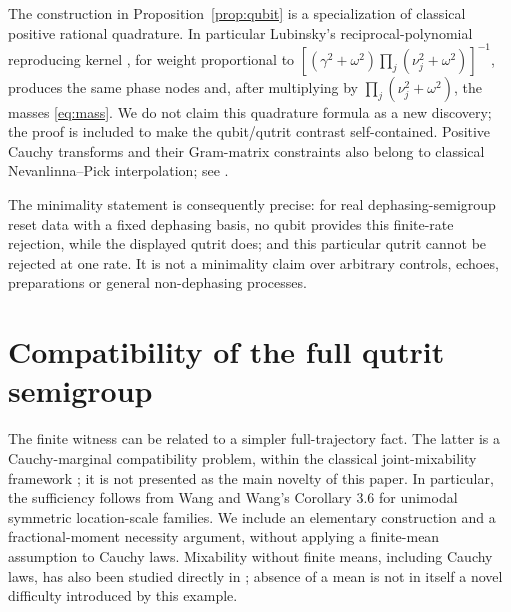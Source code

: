 \documentclass[11pt,a4paper]{article}
\begin{document}
The construction in Proposition~\ref{prop:qubit} is a specialization
of classical positive rational quadrature. In particular Lubinsky's
reciprocal-polynomial reproducing kernel \cite[equations (1.11)--(1.12)]{lubinsky},
for weight proportional to
$[(\gamma^2+\omega^2)\prod_j(\nu_j^2+\omega^2)]^{-1}$, produces
the same phase nodes and, after multiplying by
$\prod_j(\nu_j^2+\omega^2)$, the masses \eqref{eq:mass}.
We do not claim this quadrature formula as a new discovery; the proof
is included to make the qubit/qutrit contrast self-contained.
Positive Cauchy transforms and their Gram-matrix constraints also
belong to classical Nevanlinna--Pick interpolation; see
\cite[Theorem 1.2 and the Herglotz representation]{agler}.

The minimality statement is consequently precise: for real
dephasing-semigroup reset data with a fixed dephasing basis, no qubit
provides this finite-rate rejection, while the displayed qutrit does;
and this particular qutrit cannot be rejected at one rate. It is not
a minimality claim over arbitrary controls, echoes, preparations or
general non-dephasing processes.

\section{Compatibility of the full qutrit semigroup}
The finite witness can be related to a simpler full-trajectory fact.
The latter is a Cauchy-marginal compatibility problem, within the
classical joint-mixability framework \cite{wang}; it is not presented
as the main novelty of this paper.
In particular, the sufficiency follows from Wang and Wang's
Corollary 3.6 for unimodal symmetric location-scale families. We
include an elementary construction and a fractional-moment necessity
argument, without applying a finite-mean assumption to Cauchy laws.
Mixability without finite means, including Cauchy laws, has also been
studied directly in \cite{puccetti}; absence of a mean is not in itself
a novel difficulty introduced by this example.
\end{document}
